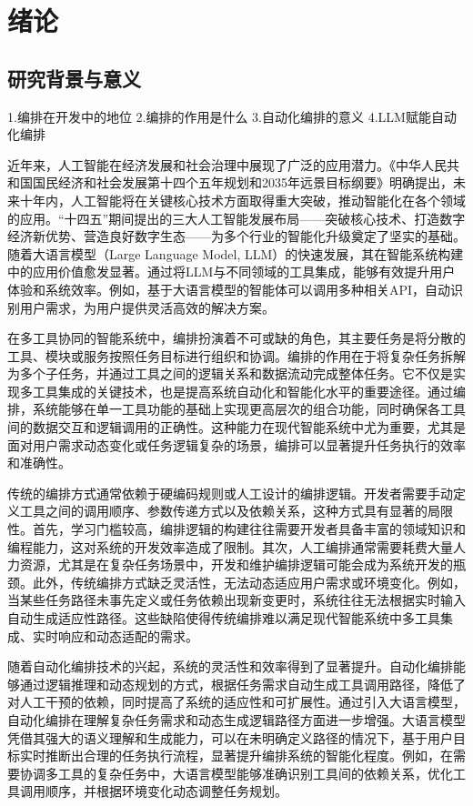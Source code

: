
\chapter{绪论}

\section{研究背景与意义}


1.编排在开发中的地位
2.编排的作用是什么
3.自动化编排的意义
4.LLM赋能自动化编排




近年来，人工智能在经济发展和社会治理中展现了广泛的应用潜力。《中华人民共和国国民经济和社会发展第十四个五年规划和2035年远景目标纲要》明确提出，未来十年内，人工智能将在关键核心技术方面取得重大突破，推动智能化在各个领域的应用。“十四五”期间提出的三大人工智能发展布局——突破核心技术、打造数字经济新优势、营造良好数字生态——为多个行业的智能化升级奠定了坚实的基础。随着大语言模型（Large Language Model, LLM）的快速发展，其在智能系统构建中的应用价值愈发显著。通过将LLM与不同领域的工具集成，能够有效提升用户体验和系统效率。例如，基于大语言模型的智能体可以调用多种相关API，自动识别用户需求，为用户提供灵活高效的解决方案。

在多工具协同的智能系统中，编排扮演着不可或缺的角色，其主要任务是将分散的工具、模块或服务按照任务目标进行组织和协调。编排的作用在于将复杂任务拆解为多个子任务，并通过工具之间的逻辑关系和数据流动完成整体任务。它不仅是实现多工具集成的关键技术，也是提高系统自动化和智能化水平的重要途径。通过编排，系统能够在单一工具功能的基础上实现更高层次的组合功能，同时确保各工具间的数据交互和逻辑调用的正确性。这种能力在现代智能系统中尤为重要，尤其是面对用户需求动态变化或任务逻辑复杂的场景，编排可以显著提升任务执行的效率和准确性。

传统的编排方式通常依赖于硬编码规则或人工设计的编排逻辑。开发者需要手动定义工具之间的调用顺序、参数传递方式以及依赖关系，这种方式具有显著的局限性。首先，学习门槛较高，编排逻辑的构建往往需要开发者具备丰富的领域知识和编程能力，这对系统的开发效率造成了限制。其次，人工编排通常需要耗费大量人力资源，尤其是在复杂任务场景中，开发和维护编排逻辑可能会成为系统开发的瓶颈。此外，传统编排方式缺乏灵活性，无法动态适应用户需求或环境变化。例如，当某些任务路径未事先定义或任务依赖出现新变更时，系统往往无法根据实时输入自动生成适应性路径。这些缺陷使得传统编排难以满足现代智能系统中多工具集成、实时响应和动态适配的需求。

随着自动化编排技术的兴起，系统的灵活性和效率得到了显著提升。自动化编排能够通过逻辑推理和动态规划的方式，根据任务需求自动生成工具调用路径，降低了对人工干预的依赖，同时提高了系统的适应性和可扩展性。通过引入大语言模型，自动化编排在理解复杂任务需求和动态生成逻辑路径方面进一步增强。大语言模型凭借其强大的语义理解和生成能力，可以在未明确定义路径的情况下，基于用户目标实时推断出合理的任务执行流程，显著提升编排系统的智能化程度。例如，在需要协调多工具的复杂任务中，大语言模型能够准确识别工具间的依赖关系，优化工具调用顺序，并根据环境变化动态调整任务规划。

